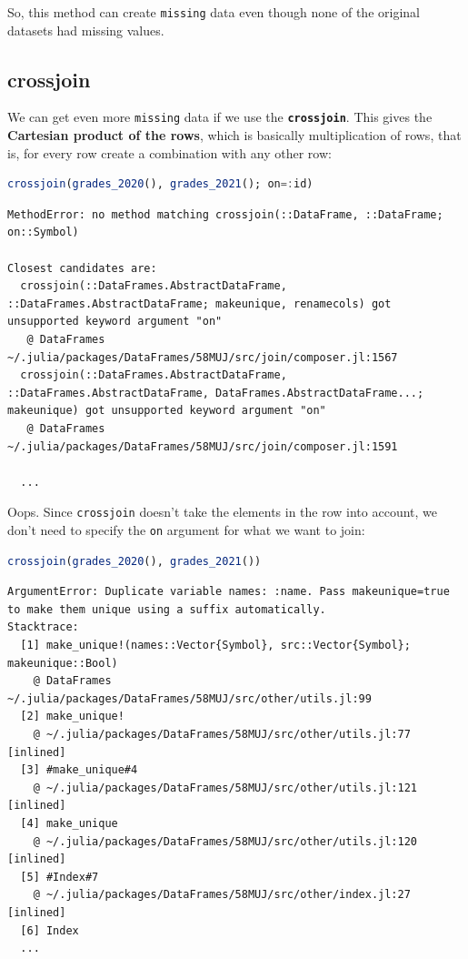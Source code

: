 \documentclass[
  notoc %
]{tufte-book}
\newcommand{\passthrough}[1]{#1}
\begin{document}
So, this method can create \passthrough{\lstinline!missing!} data even
though none of the original datasets had missing values.

\hypertarget{sec:crossjoin}{%
\subsection{crossjoin}\label{sec:crossjoin}}

We can get even more \passthrough{\lstinline!missing!} data if we use
the \textbf{\passthrough{\lstinline!crossjoin!}}. This gives the
\textbf{Cartesian product of the rows}, which is basically
multiplication of rows, that is, for every row create a combination with
any other row:

\begin{lstlisting}[language=Julia]
crossjoin(grades_2020(), grades_2021(); on=:id)
\end{lstlisting}

\begin{lstlisting}[language=Output]
MethodError: no method matching crossjoin(::DataFrame, ::DataFrame; on::Symbol)

Closest candidates are:
  crossjoin(::DataFrames.AbstractDataFrame, ::DataFrames.AbstractDataFrame; makeunique, renamecols) got unsupported keyword argument "on"
   @ DataFrames ~/.julia/packages/DataFrames/58MUJ/src/join/composer.jl:1567
  crossjoin(::DataFrames.AbstractDataFrame, ::DataFrames.AbstractDataFrame, DataFrames.AbstractDataFrame...; makeunique) got unsupported keyword argument "on"
   @ DataFrames ~/.julia/packages/DataFrames/58MUJ/src/join/composer.jl:1591

  ...
\end{lstlisting}

Oops. Since \passthrough{\lstinline!crossjoin!} doesn't take the
elements in the row into account, we don't need to specify the
\passthrough{\lstinline!on!} argument for what we want to join:

\begin{lstlisting}[language=Julia]
crossjoin(grades_2020(), grades_2021())
\end{lstlisting}

\begin{lstlisting}[language=Output]
ArgumentError: Duplicate variable names: :name. Pass makeunique=true to make them unique using a suffix automatically.
Stacktrace:
  [1] make_unique!(names::Vector{Symbol}, src::Vector{Symbol}; makeunique::Bool)
    @ DataFrames ~/.julia/packages/DataFrames/58MUJ/src/other/utils.jl:99
  [2] make_unique!
    @ ~/.julia/packages/DataFrames/58MUJ/src/other/utils.jl:77 [inlined]
  [3] #make_unique#4
    @ ~/.julia/packages/DataFrames/58MUJ/src/other/utils.jl:121 [inlined]
  [4] make_unique
    @ ~/.julia/packages/DataFrames/58MUJ/src/other/utils.jl:120 [inlined]
  [5] #Index#7
    @ ~/.julia/packages/DataFrames/58MUJ/src/other/index.jl:27 [inlined]
  [6] Index
  ...
\end{lstlisting}
\end{document}
